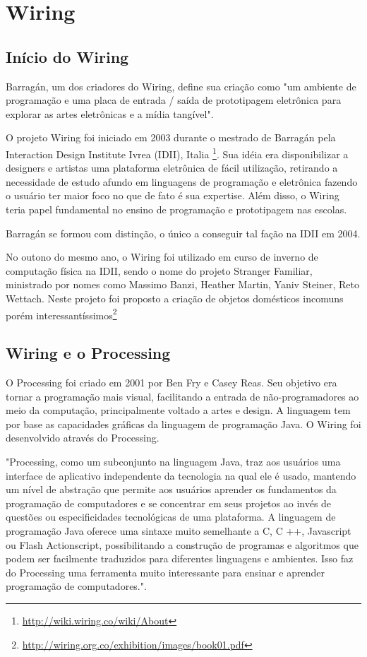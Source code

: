 \section[Wiring]{Wiring}

\subsection{Início do Wiring}
Barragán, um dos criadores do Wiring, define sua criação como "um ambiente de programação e uma placa de entrada / saída de prototipagem eletrônica para explorar as artes eletrônicas e a mídia tangível"\cite{Barragan2004}.

O projeto Wiring foi iniciado em 2003 durante o mestrado de Barragán pela Interaction Design Institute Ivrea (IDII), Italia \footnote{\url{http://wiki.wiring.co/wiki/About}}. Sua idéia era disponibilizar a designers e artistas uma plataforma eletrônica de fácil utilização, retirando a necessidade de estudo afundo em linguagens de programação e eletrônica fazendo o usuário ter maior foco no que de fato é sua expertise. Além disso, o Wiring teria papel fundamental no ensino de programação e prototipagem nas escolas.

Barragán se formou com distinção, o único a conseguir tal fação na IDII em 2004.

No outono do mesmo ano, o Wiring foi utilizado em curso de inverno de computação física na IDII, sendo o nome do projeto Stranger Familiar, ministrado por nomes como Massimo Banzi, Heather Martin, Yaniv Steiner, Reto Wettach. Neste projeto foi proposto a criação de objetos domésticos incomuns porém interessantíssimos\footnote{\url{http://wiring.org.co/exhibition/images/book01.pdf}}

\subsection{Wiring e o Processing}

O Processing foi criado em 2001 por Ben Fry e Casey Reas. Seu objetivo era tornar a programação mais visual, facilitando a entrada de não-programadores ao meio da computação, principalmente voltado a artes e design.\cite{reas2007processing} A linguagem tem por base as capacidades gráficas da linguagem de programação Java. O Wiring foi desenvolvido através do Processing.

"Processing, como um subconjunto na linguagem Java, traz aos usuários uma interface de aplicativo independente da tecnologia na qual ele é usado, mantendo um nível de abstração que permite aos usuários aprender os fundamentos da programação de computadores e se concentrar em seus projetos ao invés de questões ou especificidades tecnológicas de uma plataforma. A linguagem de programação Java oferece uma sintaxe muito semelhante a C, C ++, Javascript ou Flash Actionscript, possibilitando a construção de programas e algoritmos que podem ser facilmente traduzidos para diferentes linguagens e ambientes. Isso faz do Processing uma ferramenta muito interessante para ensinar e aprender programação de computadores."\cite{Barragan2004}.

